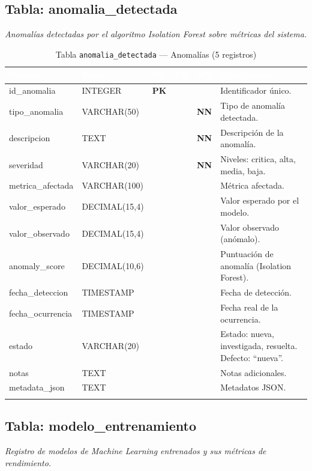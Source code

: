 \documentclass[11pt,a4paper]{article}
\newcommand{\tableheadrow}{\rowcolor{tableheader}}
\newcommand{\tablehead}[1]{\textcolor{white}{\textbf{#1}}}
\newcommand{\pk}{\textcolor{emiblue}{\textbf{PK}}}
\newcommand{\nn}{\textcolor{red!70!black}{\textbf{NN}}}
\begin{document}
\subsection{Tabla: anomalia\_detectada}
\textit{Anomalías detectadas por el algoritmo Isolation Forest sobre métricas del sistema.}

\begin{longtable}{p{4.2cm} p{2.8cm} c c c p{4.5cm}}
\toprule
\tableheadrow
\tablehead{Campo} & \tablehead{Tipo} & \tablehead{PK} & \tablehead{FK} & \tablehead{NN} & \tablehead{Descripción} \\
\midrule
\endhead
id\_anomalia & INTEGER & \pk & & & Identificador único. \\
\rowcolor{tablerow}
tipo\_anomalia & VARCHAR(50) & & & \nn & Tipo de anomalía detectada. \\
descripcion & TEXT & & & \nn & Descripción de la anomalía. \\
\rowcolor{tablerow}
severidad & VARCHAR(20) & & & \nn & Niveles: critica, alta, media, baja. \\
metrica\_afectada & VARCHAR(100) & & & & Métrica afectada. \\
\rowcolor{tablerow}
valor\_esperado & DECIMAL(15,4) & & & & Valor esperado por el modelo. \\
valor\_observado & DECIMAL(15,4) & & & & Valor observado (anómalo). \\
\rowcolor{tablerow}
anomaly\_score & DECIMAL(10,6) & & & & Puntuación de anomalía (Isolation Forest). \\
fecha\_deteccion & TIMESTAMP & & & & Fecha de detección. \\
\rowcolor{tablerow}
fecha\_ocurrencia & TIMESTAMP & & & & Fecha real de la ocurrencia. \\
estado & VARCHAR(20) & & & & Estado: nueva, investigada, resuelta. Defecto: ``nueva''. \\
\rowcolor{tablerow}
notas & TEXT & & & & Notas adicionales. \\
metadata\_json & TEXT & & & & Metadatos JSON. \\
\bottomrule
\caption{Tabla \texttt{anomalia\_detectada} — Anomalías (5 registros)}
\end{longtable}

\subsection{Tabla: modelo\_entrenamiento}
\textit{Registro de modelos de Machine Learning entrenados y sus métricas de rendimiento.}
\end{document}
